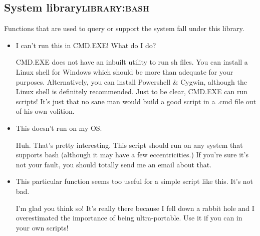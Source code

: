 \documentclass[11pt]{article}
\begin{document}
\subsection{System library\hfill{}\textsc{library:bash}}
\label{sec:org86e62bc}

Functions that are used to query or support the system fall under this library.

\begin{itemize}
\item I can't run this in CMD.EXE! What do I do?

CMD.EXE does not have an inbuilt utility to run sh files. You can install a Linux shell for Windows which should be more than adequate for your purposes. Alternatively, you can install Powershell \& Cygwin, although the Linux shell is definitely recommended. Just to be clear, CMD.EXE can run scripts! It's just that no sane man would build a good script in a .cmd file out of his own volition.

\item This doesn't run on my OS.

Huh. That's pretty interesting. This script should run on any system that supports bash (although it may have a few eccentricities.)
If you're sure it's not your fault, you should totally send me an email about that.

\item This particular function seems too useful for a simple script like this. It's not bad.

I'm glad you think so! It's really there because I fell down a rabbit hole and I overestimated the importance of being ultra-portable. 
Use it if you can in your own scripts!
\end{itemize}
\end{document}
